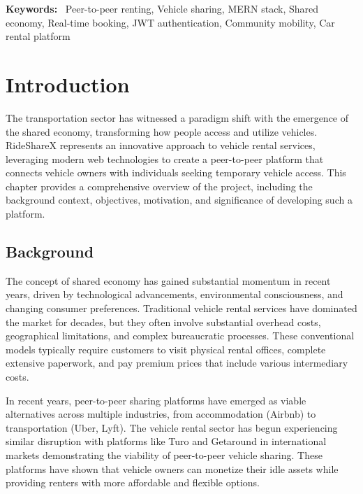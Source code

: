 \documentclass[12pt,a4paper]{report}
\newenvironment{keywords}{%
    \vspace{0.5cm}
    \noindent\textbf{Keywords:}\ 
}{\par}
\begin{document}
	\begin{keywords}
		Peer-to-peer renting, Vehicle sharing, MERN stack, Shared economy, Real-time booking, JWT authentication, Community mobility, Car rental platform
	\end{keywords}

	\setcounter{page}{1}
		
	\tableofcontents
	\listoffigures
	\listoftables
	
	\clearpage
	\printglossary[title=Abbreviations,type=\acronymtype]
	
	
	\chapter{Introduction}
	\setcounter{page}{1}
	The transportation sector has witnessed a paradigm shift with the emergence of the shared economy, transforming how people access and utilize vehicles. RideShareX represents an innovative approach to vehicle rental services, leveraging modern web technologies to create a peer-to-peer platform that connects vehicle owners with individuals seeking temporary vehicle access. This chapter provides a comprehensive overview of the project, including the background context, objectives, motivation, and significance of developing such a platform.
	
	\section{Background}
	The concept of shared economy has gained substantial momentum in recent years, driven by technological advancements, environmental consciousness, and changing consumer preferences. Traditional vehicle rental services have dominated the market for decades, but they often involve substantial overhead costs, geographical limitations, and complex bureaucratic processes. These conventional models typically require customers to visit physical rental offices, complete extensive paperwork, and pay premium prices that include various intermediary costs.
	
	In recent years, peer-to-peer sharing platforms have emerged as viable alternatives across multiple industries, from accommodation (Airbnb) to transportation (Uber, Lyft). The vehicle rental sector has begun experiencing similar disruption with platforms like Turo and Getaround in international markets demonstrating the viability of peer-to-peer vehicle sharing. These platforms have shown that vehicle owners can monetize their idle assets while providing renters with more affordable and flexible options.
	
\end{document}
